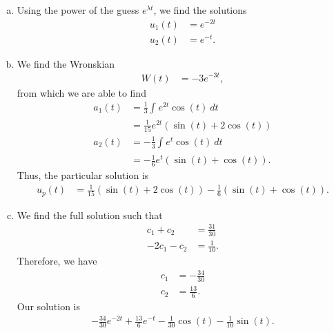 \documentclass[10pt]{mypackage}
\begin{document}
\begin{solution}[39.17]\hfill
  \begin{enumerate}[(a)]
    \item Using the power of the guess $e^{\lambda t}$, we find the solutions
      \begin{align*}
        u_1(t) &= e^{-2t}\\
        u_2(t) &= e^{-t}.
      \end{align*}
    \item We find the Wronskian
      \begin{align*}
        W(t) &= -3e^{-3t},
      \end{align*}
      from which we are able to find
      \begin{align*}
        a_1(t) &= \frac{1}{3} \int_{}^{} e^{2t}\cos(t)\:dt\\
               &= \frac{1}{15}e^{2t}\left( \sin\left( t \right) + 2\cos\left( t \right) \right)\\
        a_2(t) &= -\frac{1}{3} \int_{}^{} e^{t}\cos\left( t \right)\:dt\\
               &= -\frac{1}{6}e^{t}\left( \sin\left( t \right) + \cos\left( t \right) \right).
      \end{align*}
      Thus, the particular solution is
      \begin{align*}
        u_p(t) &= \frac{1}{15}\left( \sin\left( t \right) + 2\cos\left( t \right) \right) -\frac{1}{6}\left( \sin\left( t \right) + \cos\left( t \right) \right).
      \end{align*}
    \item We find the full solution such that
      \begin{align*}
        c_1 + c_2 &= \frac{31}{30}\\
        -2c_1 -c_2 &= \frac{1}{10}.
      \end{align*}
      Therefore, we have
      \begin{align*}
        c_1 &= -\frac{34}{30}\\
        c_2 &= \frac{13}{6}.
      \end{align*}
      Our solution is
      \begin{align*}
        -\frac{34}{30}e^{-2t} + \frac{13}{6}e^{-t}  - \frac{1}{30}\cos\left( t \right)- \frac{1}{10}\sin\left( t \right).
      \end{align*}
  \end{enumerate}
\end{solution}
\end{document}
